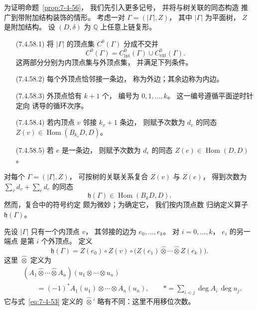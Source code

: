 为证明命题~\ref{prop:7-4-56}，
我们先引入更多记号，
并将与树关联的同态构造
推广到带附加结构装饰的情形。
考虑一对
$\Gamma=(|\Gamma|,Z)$，
其中 $|\Gamma|$ 为平面树，
$Z$ 是附加结构。
设 $(D,\delta)$ 为
$\mathbb Q$ 上任意上链复形。
\begin{enumerate}
\item[\textup{(7.4.58.1)}]\label{cond:7-4-58-1}
将 $|\Gamma|$ 的顶点集
$C^0(\Gamma)$ 分成不交并
\[
C^0(\Gamma)
=C^0_{\mathrm{int}}(\Gamma)
\cup C^0_{\mathrm{ext}}(\Gamma).
\]
这两部分分别为内顶点集与外顶点集，
并满足下列条件。

\item[\textup{(7.4.58.2)}]\label{cond:7-4-58-2}
每个外顶点恰邻接一条边，
称为外边；其余边称为内边。

\item[\textup{(7.4.58.3)}]\label{cond:7-4-58-3}
外顶点恰有 $k+1$ 个，
编号为 $0,1,\ldots,k$。
这一编号遵循平面逆时针定向
诱导的循环次序。

\item[\textup{(7.4.58.4)}]\label{cond:7-4-58-4}
若内顶点 $v$ 邻接 $k_v+1$ 条边，
则赋予次数为 $d_v$ 的同态
$Z(v)\in\operatorname{Hom}(B_{k_v}D,D)$。

\item[\textup{(7.4.58.5)}]\label{cond:7-4-58-5}
若 $e$ 是一条边，
则赋予次数为 $d_e$ 的同态
$Z(e)\in\operatorname{Hom}(D,D)$。
\end{enumerate}

对每个
$\Gamma=(|\Gamma|,Z)$，
可按树的关联关系复合
$Z(v)$ 与 $Z(e)$，
得到次数为
$\sum_vd_v+\sum_ed_e$
的同态
\[
\mathfrak h(\Gamma)
\in\operatorname{Hom}(B_kD,D).
\]
然而，复合中的符号约定
颇为微妙；为确定它，
我们按内顶点数
归纳定义算子 $\mathfrak h(\Gamma)$。

先设 $|\Gamma|$
只有一个内顶点 $v$，
其邻接的边为
$e_0,\ldots,e_k$。
对 $i=0,\ldots,k$，
$e_i$ 的另一端点
是第 $i$ 个外顶点。
定义
\begin{equation}
\mathfrak h(\Gamma)
=Z(e_0)\circ Z(v)\circ
\bigl(
Z(e_1)\widehat\otimes\cdots
\widehat\otimes Z(e_k)
\bigr).
\tag{7.4.59}\label{eq:7-4-59}
\end{equation}
这里 $\widehat\otimes$ 定义为
\[
\begin{aligned}
&(A_1\widehat\otimes\cdots
\widehat\otimes A_n)
(u_1\otimes\cdots\otimes u_n)\\
&\qquad=(-1)^*
A_1(u_1)\otimes\cdots\otimes A_n(u_n),
\qquad
*=\sum_{i<j}\deg A_i\,\deg u_j.
\end{aligned}
\]
它与式~\eqref{eq:7-4-53}
定义的 $\widehat\otimes'$
略有不同：这里不用移位次数。

